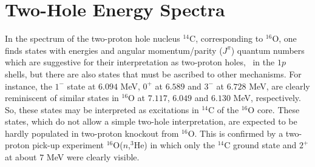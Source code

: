 \section{Two-Hole Energy Spectra\label{sec:twohol}}
In the spectrum\cite{Ajz1315} of the two-proton hole nucleus $^{14}$C,
corresponding
to $^{16}$O, one finds states with energies and 
angular momentum/parity ($J^\pi$) quantum numbers which are suggestive for 
their interpretation as two-proton holes, \eg\ in the $1p$ shells, 
but there are also states that must be ascribed to other mechanisms.
For instance, the 
 $1^-$ state at $6.094$ MeV, $0^+$ at $6.589$ and $3^-$ at $6.728$ MeV,
are clearly reminiscent of similar states in $^{16}$O at $7.117$, $6.049$ and
 $6.130$ MeV\cite{Ajz1617}, respectively. So, these states may be interpreted 
as excitations
in $^{14}$C of the $^{16}$O core. These states, which do not allow a simple 
two-hole interpretation, are expected to be hardly populated in two-proton 
knockout from $^{16}$O. This is confirmed by a two-proton pick-up 
experiment $^{16}$O($n$,$^3$He) in which only the $^{14}$C ground state and 
$2^+$ at about $7$ MeV were clearly visible\cite{Ajz1315,Ajz1617}.

